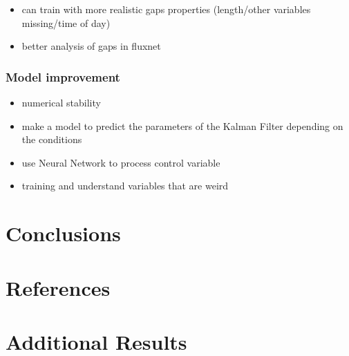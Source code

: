 \documentclass{article}
\let\Oldsection\section
\renewcommand{\section}{\FloatBarrier\Oldsection}
\begin{document}
\begin{itemize}
    \item can train with more realistic gaps properties (length/other variables missing/time of day)
    \item better analysis of gaps in fluxnet
\end{itemize}

\subsubsection{Model improvement}

\begin{itemize}
\item numerical stability
\item make a model to predict the parameters of the Kalman Filter depending on the conditions
\item use Neural Network to process control variable
\item training and understand variables that are weird
\end{itemize}



\section{Conclusions}



\section*{References}

\printbibliography

\appendix

\FloatBarrier


\section{Additional Results}
\end{document}
